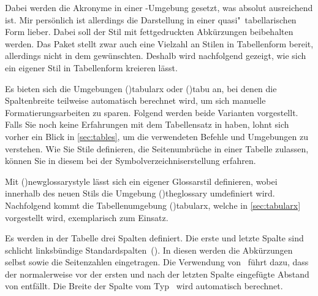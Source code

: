 \documentclass[%
  english,ngerman,%
  cdgeometry=no,DIV=12,%
  cd=false,cdfont=false,cdtitle=true,%
  headings=normal,%
  automark,%
  listof=toc,%
]{tudscrartcl}
\begin{document}
\begin{quoting}[rightmargin=0pt]
\glsdisablehyper
\printacronyms[style=simple]
\end{quoting}
%
Dabei werden die Akronyme in einer -Umgebung gesetzt,
was absolut ausreichend ist. Mir persönlich ist allerdings die Darstellung in 
einer quasi"~tabellarischen Form lieber. Dabei soll der Stil mit fettgedruckten 
Abkürzungen beibehalten werden. Das Paket  stellt zwar 
auch eine Vielzahl an Stilen in Tabellenform bereit, allerdings nicht in dem 
gewünschten. Deshalb wird nachfolgend gezeigt, wie sich ein eigener Stil in 
Tabellenform kreieren lässt.

Es bieten sich die Umgebungen \Environment(){tabularx} oder 
\Environment(){tabu} an, bei denen die Spaltenbreite teilweise 
automatisch berechnet wird, um sich manuelle Formatierungsarbeiten zu sparen. 
Folgend werden beide Varianten vorgestellt. Falls Sie noch keine Erfahrungen 
mit dem Tabellensatz in  haben, lohnt sich vorher ein Blick in 
\autoref{sec:tables}, um die verwendeten Befehle und Umgebungen zu verstehen. 
Wie Sie Stile definieren, die Seitenumbrüche in einer Tabelle zulassen, können 
Sie in diesem  bei der Symbolverzeichniserstellung 
erfahren.



Mit \Macro(){newglossarystyle} lässt sich ein eigener 
Glossarstil definieren, wobei innerhalb des neuen Stils die Umgebung 
\Environment(){theglossary} umdefiniert wird. Nachfolgend 
kommt die Tabellenumgebung \Environment(){tabularx}, welche 
in \autoref{sec:tabularx} vorgestellt wird, exemplarisch zum Einsatz.

Es werden in der Tabelle drei Spalten definiert. Die erste und letzte Spalte 
sind schlicht linksbündige Standardspalten~(). In diesen werden die 
Abkürzungen selbst sowie die Seitenzahlen eingetragen. Die Verwendung 
von~ führt dazu, dass der normalerweise vor der ersten 
und nach der letzten Spalte eingefügte Abstand von  entfällt. 
Die Breite der Spalte vom Typ~ wird automatisch berechnet.
\end{document}
